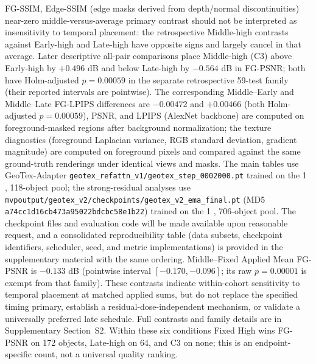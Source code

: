 \documentclass[times,twocolumn,final]{elsarticle}
\providecommand{\DIFadd}[1]{{\protect\color{blue} \sf #1}} %
\providecommand{\DIFdel}[1]{{\protect\color{red} \scriptsize #1}} %
\providecommand{\DIFaddbegin}{} %
\providecommand{\DIFaddend}{} %
\providecommand{\DIFdelbegin}{} %
\providecommand{\DIFdelend}{} %
\begin{document}
\DIFdel{FG-SSIM, Edge-SSIM (edge masks derived from depth/normal discontinuities)}\DIFdelend \DIFaddbegin \DIFadd{near-zero middle-versus-average primary contrast should not be interpreted as insensitivity to temporal placement: the retrospective Middle-high contrasts against Early-high and Late-high have opposite signs and largely cancel in that average. Later descriptive all-pair comparisons place Middle-high (C3) above Early-high by $+0.496$ dB and below Late-high by $-0.564$ dB in FG-PSNR; both have Holm-adjusted $p=0.00059$ in the separate retrospective 59-test family (their reported intervals are pointwise). The corresponding Middle--Early and Middle--Late FG-LPIPS differences are $-0.00472$ and $+0.00466$ (both Holm-adjusted $p=0.00059$)}\DIFaddend , \DIFdelbegin \DIFdel{PSNR, and LPIPS (AlexNet backbone) are computed on foreground-masked regions after background normalization; the texture diagnostics (foreground Laplacian variance, RGB standard deviation, gradient magnitude) are computed on foreground pixels and compared against the same ground-truth renderings under identical views and masks. The main tables use GeoTex-Adapter \texttt{geotex\_refattn\_v1/geotex\_step\_0002000.pt} trained on the 1}%
\DIFdel{, }%
\DIFdel{118-object pool; the strong-residual analyses use \texttt{mvpoutput/geotex\_v2/checkpoints/geotex\_v2\_ema\_final.pt} (MD5 \texttt{a74cc1d16cb473a95022bdcbc58e1b22}) trained on the 1}%
\DIFdel{, }%
\DIFdel{706-object pool. The checkpoint files and evaluation code will be made available upon reasonable request, and a consolidated reproducibility table (data subsets, checkpoint identifiers, scheduler, seed, and metric implementations) is provided in the supplementary material}\DIFdelend \DIFaddbegin \DIFadd{with the same ordering. Middle--Fixed Applied Mean FG-PSNR is $-0.133$ dB (pointwise interval $[-0.170,-0.096]$; its raw $p=0.00001$ is exempt from that family). These contrasts indicate within-cohort sensitivity to temporal placement at matched applied sums, but do not replace the specified timing primary, establish a residual-dose-independent mechanism, or validate a universally preferred late schedule. Full contrasts and family details are in Supplementary Section~S2. Within these six conditions Fixed High wins FG-PSNR on 172 objects, Late-high on 64, and C3 on none; this is an endpoint-specific count, not a universal quality ranking}\DIFaddend .
\end{document}
